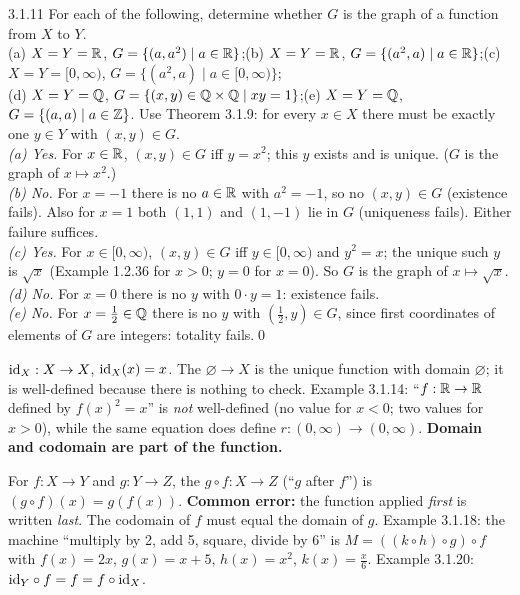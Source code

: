 \begin{bookex}[essential]{3.1.11}
For each of the following, determine whether $G$ is the graph of a function from $X$ to $Y$.\\
(a) $X=Y=\mathbb{R}$, $G=\{(a,a^2)\mid a\in\mathbb{R}\}$;\quad (b) $X=Y=\mathbb{R}$, $G=\{(a^2,a)\mid a\in\mathbb{R}\}$;\quad (c) $X=Y=[0,\infty)$, $G=\{(a^2,a)\mid a\in[0,\infty)\}$;\\
(d) $X=Y=\mathbb{Q}$, $G=\{(x,y)\in\mathbb{Q}\times\mathbb{Q}\mid xy=1\}$;\quad (e) $X=Y=\mathbb{Q}$, $G=\{(a,a)\mid a\in\mathbb{Z}\}$.
\solution
Use Theorem 3.1.9: for every $x\in X$ there must be exactly one $y\in Y$ with $(x,y)\in G$.\\
\emph{(a) Yes.} For $x\in\mathbb{R}$, $(x,y)\in G$ iff $y=x^2$; this $y$ exists and is unique. ($G$ is the graph of $x\mapsto x^2$.)\\
\emph{(b) No.} For $x=-1$ there is no $a\in\mathbb{R}$ with $a^2=-1$, so no $(x,y)\in G$ (existence fails). Also for $x=1$ both $(1,1)$ and $(1,-1)$ lie in $G$ (uniqueness fails). Either failure suffices.\\
\emph{(c) Yes.} For $x\in[0,\infty)$, $(x,y)\in G$ iff $y\in[0,\infty)$ and $y^2=x$; the unique such $y$ is $\sqrt x$ (Example 1.2.36 for $x>0$; $y=0$ for $x=0$). So $G$ is the graph of $x\mapsto\sqrt x$.\\
\emph{(d) No.} For $x=0$ there is no $y$ with $0\cdot y=1$: existence fails.\\
\emph{(e) No.} For $x=\frac12\in\mathbb{Q}$ there is no $y$ with $(\frac12,y)\in G$, since first coordinates of elements of $G$ are integers: totality fails.\qed
\end{bookex}

\begin{key}
$\mathrm{id}_X:X\to X$, $\mathrm{id}_X(x)=x$. The  $\varnothing\to X$ is the unique function with domain $\varnothing$; it is well-defined because there is nothing to check. Example 3.1.14: ``$f:\mathbb{R}\to\mathbb{R}$ defined by $f(x)^2=x$'' is \emph{not} well-defined (no value for $x<0$; two values for $x>0$), while the same equation does define $r:(0,\infty)\to(0,\infty)$. \textbf{Domain and codomain are part of the function.}
\end{key}

\begin{key}
For $f:X\to Y$ and $g:Y\to Z$, the  $g\circ f:X\to Z$ (``$g$ after $f$'') is $(g\circ f)(x)=g(f(x))$. \textbf{Common error:} the function applied \emph{first} is written \emph{last}. The codomain of $f$ must equal the domain of $g$. Example 3.1.18: the machine ``multiply by 2, add 5, square, divide by 6'' is $M=((k\circ h)\circ g)\circ f$ with $f(x)=2x$, $g(x)=x+5$, $h(x)=x^2$, $k(x)=\frac x6$. Example 3.1.20: $\mathrm{id}_Y\circ f=f=f\circ\mathrm{id}_X$.
\end{key}

